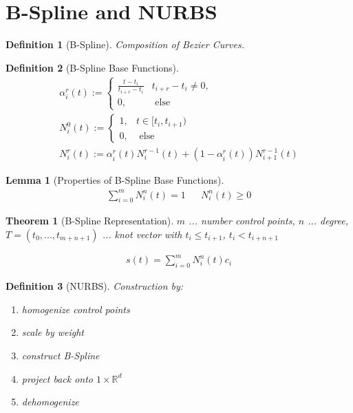 \documentclass[conference]{IEEEtran}
\newtheorem{definition}{Definition}
\newtheorem{lemma}{Lemma}
\newtheorem{theorem}{Theorem}
\begin{document}
\section{B-Spline and NURBS}

\begin{definition}[B-Spline]
	Composition of Bezier Curves.
\end{definition}

\begin{definition}[B-Spline Base Functions]
	\begin{align*}
		\alpha_i^r(t) := \begin{cases}
							\frac{t-t_i}{t_{i+r}-t_i} & t_{i+r}-t_i \neq 0,\\
							0, & \text{ else}
						\end{cases}\\
		N_i^0(t) := \begin{cases}
						1, & t \in [t_i, t_{i+1})\\
						0, & \text{ else}
					\end{cases}\\
		N_i^r(t) := \alpha_i^r(t) N_i^{r-1}(t) + (1-\alpha_i^r(t)) N_{i+1}^{r-1}(t)
	\end{align*}
\end{definition}

\begin{lemma}[Properties of B-Spline Base Functions]
	\begin{align*}
		\sum_{i=0}^{m} N_i^n(t) = 1 && N_i^n(t) \geq 0
	\end{align*}
\end{lemma}

\begin{theorem}[B-Spline Representation]
	$m$ ... number control points, $n$ ... degree, $T=(t_0, ..., t_{m+n+1})$ ... knot vector with $t_i \leq t_{i+1}$, $t_i < t_{i+n+1}$
	
	\begin{align*}
		s(t) = \sum_{i=0}^{m} N_i^n(t) c_i
	\end{align*}
\end{theorem}

\begin{definition}[NURBS]
	Construction by:\\
	\begin{enumerate}
		\item homogenize control points
		\item scale by weight
		\item construct B-Spline
		\item project back onto $1\times\mathbb{R}^d$
		\item dehomogenize
	\end{enumerate}
\end{definition}
\end{document}
